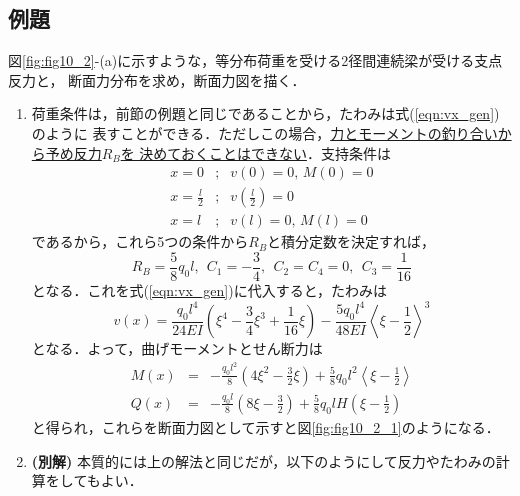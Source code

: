 \documentclass[10pt,a4j]{jbook}
\begin{document}
\subsection{例題}
図\ref{fig:fig10_2}-(a)に示すような，等分布荷重を受ける2径間連続梁が受ける支点反力と，
断面力分布を求め，断面力図を描く．
\begin{enumerate}
\item
荷重条件は，前節の例題と同じであることから，たわみは式(\ref{eqn:vx_gen})のように
表すことができる．ただしこの場合，\underline{力とモーメントの釣り合いから予め反力$R_B$を
決めておくことはできない}．支持条件は
\begin{eqnarray}
	x=0 &;& v(0)=0, \, M(0)=0 
	\label{eqn:BC_0}
	\\
	x=\frac{l}{2} &;& v\left( \frac{l}{2} \right)=0
	\label{eqn:BC_l2}
	\\
	x=l &;& v(l)=0, \, M(l)=0
	\label{eqn:BC_l}
\end{eqnarray}
であるから，これら5つの条件から$R_B$と積分定数を決定すれば，
\begin{equation}
	R_B=\frac{5}{8}q_0l, \ \ C_1=-\frac{3}{4}, \ \ C_2=C_4=0, \ \ C_3=\frac{1}{16}
\end{equation}
となる．これを式(\ref{eqn:vx_gen})に代入すると，たわみは
\begin{equation}
	v(x)=\frac{q_0l^4}{24EI}\left( \xi^4-\frac{3}{4}\xi^3 +\frac{1}{16}\xi \right)
	-
	\frac{5q_0l^4}{48EI}\left< \xi-\frac{1}{2}\right>^3
\end{equation}
となる．よって，曲げモーメントとせん断力は
\begin{eqnarray}
	M(x) &= & 
		-\frac{q_0l^2}{8}\left(4\xi^2 -\frac{3}{2}\xi \right)
		+
		\frac{5}{8}q_0l^2\left< \xi-\frac{1}{2}\right>
	\\
	Q(x) &= & 
		-\frac{q_0l}{8}\left(8\xi -\frac{3}{2} \right)
		+
		\frac{5}{8}q_0lH\left( \xi-\frac{1}{2}\right)
\end{eqnarray}
と得られ，これらを断面力図として示すと図\ref{fig:fig10_2_1}のようになる．
\item
{\bf (別解)}
本質的には上の解法と同じだが，以下のようにして反力やたわみの計算をしてもよい．


\end{enumerate}
\end{document}
